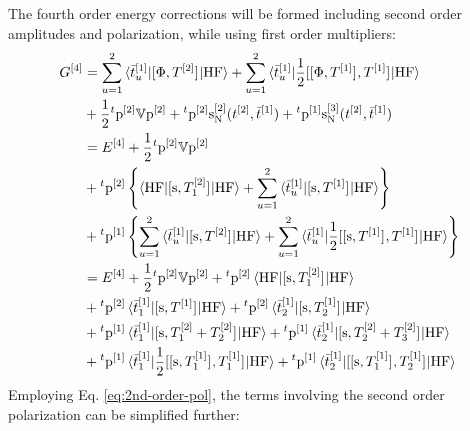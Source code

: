 The fourth order energy corrections will be formed including second
order amplitudes and polarization, while using first order multipliers:
\begin{equation}\label{eq:pted-mbpt-4th}
  \begin{aligned}
    G^{[4]} &=
    \sum_{u=1}^2\braket{\bar{t}_{u}^{[1]} | [ \Phi, T^{[2]} ]^{} | \mathrm{HF}}
    +
    \sum_{u=1}^2\braket{\bar{t}_{u}^{[1]} |
    \frac{1}{2}[ [ \Phi, T^{[1]} ]^{}, T^{[1]} ]^{} | \mathrm{HF}}
    \\
    &+\frac{1}{2}{}^t\mathrm{p}^{[2]}\mathbb{V}\mathrm{p}^{[2]}
    + {}^t\mathrm{p}^{[2]}\mathrm{s}_{\mathrm{N}}^{[2]}(t_{}^{[2]}, \bar{t}_{}^{[1]})
    + {}^t\mathrm{p}^{[1]}\mathrm{s}_{\mathrm{N}}^{[3]}(t_{}^{[2]}, \bar{t}_{}^{[1]}) \\
    &= E^{[4]}
    + \frac{1}{2}{}^t\mathrm{p}^{[2]}\mathbb{V}\mathrm{p}^{[2]} \\
    &+{}^t\mathrm{p}^{[2]}
    \left\lbrace
    \braket{\mathrm{HF} | [ \mathrm{s}, T_1^{[2]} ]^{} | \mathrm{HF}}
    +
    \sum_{u=1}^2\braket{\bar{t}_{u}^{[1]}|
    [ \mathrm{s}, T^{[1]} ]^{} | \mathrm{HF} }
    \right\rbrace \\
    &+{}^t\mathrm{p}^{[1]}
    \left\lbrace
    \sum_{u=1}^2\braket{\bar{t}_{u}^{[1]}|
    [ \mathrm{s}, T^{[2]} ]^{} | \mathrm{HF}}
    +
    \sum_{u=1}^2\braket{\bar{t}_{u}^{[1]}|
    \frac{1}{2}
    [ [ \mathrm{s}, T^{[1]} ]^{}, T^{[1]} ]^{}
    |
    \mathrm{HF}}
    \right\rbrace \\
  &= E^{[4]}
    + \frac{1}{2}{}^t\mathrm{p}^{[2]}\mathbb{V}\mathrm{p}^{[2]}
    + {}^t\mathrm{p}^{[2]}
      \braket{\mathrm{HF} | [ \mathrm{s}, T_1^{[2]} ]^{} | \mathrm{HF}} \\
    &+ {}^t\mathrm{p}^{[2]}
      \braket{\bar{t}_{1}^{[1]}| [ \mathrm{s}, T^{[1]} ]^{} | \mathrm{HF} }
    + {}^t\mathrm{p}^{[2]}
       \braket{\bar{t}_{2}^{[1]}| [ \mathrm{s}, T_2^{[1]} ]^{} | \mathrm{HF} } \\
    &+
    {}^t\mathrm{p}^{[1]}
    \braket{\bar{t}_{1}^{[1]} | [ \mathrm{s}, T_1^{[2]} + T_2^{[2]} ]^{} | \mathrm{HF}}
    +
    {}^t\mathrm{p}^{[1]}
    \braket{\bar{t}_{2}^{[1]} | [ \mathrm{s}, T_2^{[2]} + T_3^{[2]} ]^{} | \mathrm{HF}}
    \\
    &+
    {}^t\mathrm{p}^{[1]}
    \braket{\bar{t}_{1}^{[1]} |
    \frac{1}{2}[ [ \mathrm{s}, T_1^{[1]} ]^{}, T_1^{[1]} ]^{}
    |
    \mathrm{HF}}
    +
    {}^t\mathrm{p}^{[1]}
    \braket{\bar{t}_{2}^{[1]} |
    [ [ \mathrm{s}, T_1^{[1]} ]^{}, T_2^{[1]} ]^{}
    |
    \mathrm{HF}}
  \end{aligned}
\end{equation}
Employing Eq. \eqref{eq:2nd-order-pol}, the terms involving the
second order polarization can be simplified further:
